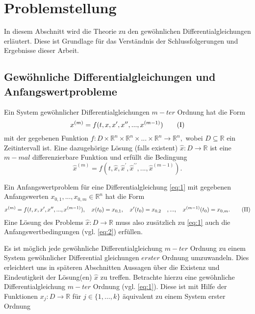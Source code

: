 \section{Problemstellung}
In diesem Abschnitt wird die Theorie zu den gewöhnlichen Differentialgleichungen erläutert. Diese ist Grundlage für
das Verständnis der Schlussfolgerungen und Ergebnisse dieser Arbeit.

\subsection{Gewöhnliche Differentialgleichungen und Anfangswertprobleme}
\begin{definition}
    Ein System gewöhnlicher Differentialgleichungen $m-ter$ Ordnung hat die Form
    \[
        x^{(m)} = f(t, x, x^{\prime}, x^{\prime\prime}, ..., x^{(m-1)}) \label{eq:1} \tag{\RNum{1}}
    \]
    mit der gegebenen Funktion
    $
    f : D \times \mathbb{R}^{n} \times \mathbb{R}^{n} \times ... \times \mathbb{R}^{n} \rightarrow \mathbb{R}^{n},
    $
    wobei $D \subseteq \mathbb{R}$ ein Zeitintervall ist. Eine dazugehörige Lösung (falls existent)
    $\hat{x} : D \rightarrow \mathbb{R}$ ist eine $m-mal$ differenzierbare Funktion und erfüllt die Bedingung
    \[
        \hat{x}^{(m)} = f(t, \hat{x},\hat{x}^{\prime},\hat{x}^{\prime\prime}, ...,\hat{x}^{(m-1)}).
    \]
\end{definition}
\begin{definition}
    Ein Anfangswertproblem für eine Differentialgleichung \eqref{eq:1} mit gegebenen Anfangswerten $x_{0,1},
    ...,x_{0,m} \in \mathbb{R}^{n}$ hat die Form
    \[
        x^{(m)} = f(t, x, x^{\prime}, x^{\prime\prime}, ..., x^{(m-1)}),\quad x(t_{0})=x_{0,1},\quad x^{\prime}(t_{0})=x_{0,2} \quad
        ,...,\quad x^{(m-1)}(t_{0})=x_{0,m}. \label{eq:2} \tag{\RNum{2}}
    \]
    Eine Lösung des Problems $\hat{x} : D \rightarrow \mathbb{R}$ muss also zusätzlich zu \eqref{eq:1} auch die
    Anfangswertbedingungen (vgl. \eqref{eq:2}) erfüllen.
\end{definition}
Es ist möglich jede gewöhnliche Differentialgleichung $m-ter$ Ordnung zu einem System gewöhnlicher Differential
gleichungen $erster$ Ordnung umzuwandeln. Dies erleichtert uns in späteren Abschnitten Aussagen über die Existenz
und Eindeutigkeit der Lösung(en) $\hat{x}$ zu treffen.
Betrachte hierzu eine gewöhnliche Differentialgleichung $m-ter$ Ordnung (vgl. \eqref{eq:1}). Diese ist mit Hilfe
der Funktionen $x_{j}:D \rightarrow \mathbb{R}$ für $j \in \{1,\dots,k\}$ äquivalent zu einem System erster Ordnung
